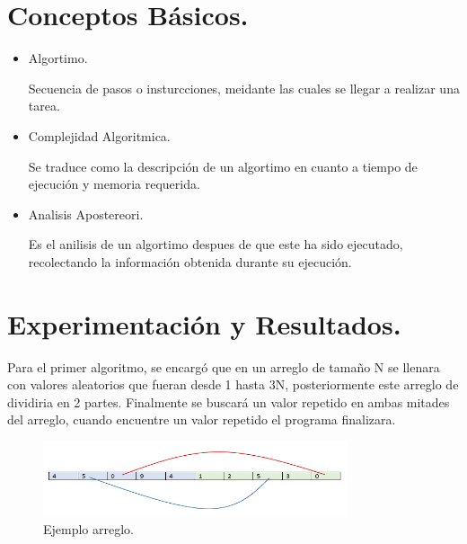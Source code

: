 \documentclass{report}
\begin{document}
	\section* {Conceptos Básicos.}
		\begin{itemize}
			\item
			\begin{bf}
				\large Algortimo. \par
			\end{bf}
		
			\large Secuencia de pasos o insturcciones, meidante las cuales se llegar a realizar una tarea. \par
		
			\item
			\begin{bf}
				\large Complejidad Algoritmica. \par
			\end{bf}
		
			\large Se traduce como la descripción de un algortimo en cuanto a tiempo de ejecución y memoria requerida. \par
		
			\item
			\begin{bf}
				\large Analisis Apostereori. \par
			\end{bf}
		
			\large Es el anilisis de un algortimo despues de que este ha sido ejecutado, recolectando la información obtenida durante su ejecución. \par
			
		\end{itemize}
	
	\section* {Experimentación y Resultados.}
	\large Para el primer algoritmo, se encargó que en un arreglo de tamaño N se llenara con valores aleatorios que fueran desde 1 hasta 3N, posteriormente este arreglo de dividiria en 2 partes. Finalmente se buscará un valor repetido en ambas mitades del arreglo, cuando encuentre un valor repetido el programa finalizara. \par
	\begin{figure}[h]
		\centering
		\includegraphics[width=0.8\textwidth]{1} \par
		\caption{Ejemplo arreglo.}
	\end{figure}
\end{document}
